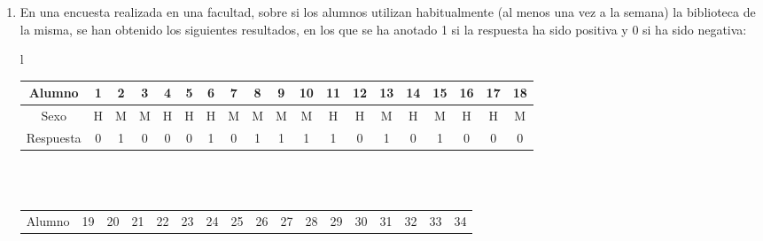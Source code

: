 \documentclass[a4paper]{article}
\begin{document}
\begin{enumerate}[leftmargin=*]
\begin{enumerate}
\end{enumerate}

\item En una encuesta realizada en una facultad, sobre si los
alumnos utilizan habitualmente (al menos una vez a la semana) la
biblioteca de la misma, se han obtenido los siguientes resultados,
en los que se ha anotado 1 si la respuesta ha sido positiva y 0 si
ha sido negativa:
\begin{center}
\begin{tabular}{l}
\begin{tabular}{|l|l|l|l|l|l|l|l|l|l|l|l|l|l|l|l|l|l|l|}
\hline
\multicolumn{1}{|c|}{Alumno} & \multicolumn{1}{c|}{1} & \multicolumn{1}{c|}{2} & \multicolumn{1}{c|}{3} & \multicolumn{1}{c|}{4} & \multicolumn{1}{c|}{5} & \multicolumn{1}{c|}{6} & \multicolumn{1}{c|}{7} & \multicolumn{1}{c|}{8} & \multicolumn{1}{c|}{9} & \multicolumn{1}{c|}{10} & \multicolumn{1}{c|}{11} & \multicolumn{1}{c|}{12} & \multicolumn{1}{c|}{13} & \multicolumn{1}{c|}{14} & \multicolumn{1}{c|}{15} & \multicolumn{1}{c|}{16} & \multicolumn{1}{c|}{17} & \multicolumn{1}{c|}{18} \\
\hline
\multicolumn{1}{|c|}{Sexo} & \multicolumn{1}{c|}{H} & \multicolumn{1}{c|}{M} & \multicolumn{1}{c|}{M} & \multicolumn{1}{c|}{H} & \multicolumn{1}{c|}{H} & \multicolumn{1}{c|}{H} & \multicolumn{1}{c|}{M} & \multicolumn{1}{c|}{M} & \multicolumn{1}{c|}{M} & \multicolumn{1}{c|}{M} & \multicolumn{1}{c|}{H} & \multicolumn{1}{c|}{H} & \multicolumn{1}{c|}{M} & \multicolumn{1}{c|}{H} & \multicolumn{1}{c|}{M} & \multicolumn{1}{c|}{H} & \multicolumn{1}{c|}{H} & \multicolumn{1}{c|}{M} \\
\hline
\multicolumn{1}{|c|}{Respuesta} & \multicolumn{1}{c|}{0} & \multicolumn{1}{c|}{1} & \multicolumn{1}{c|}{0} & \multicolumn{1}{c|}{0} & \multicolumn{1}{c|}{0} & \multicolumn{1}{c|}{1} & \multicolumn{1}{c|}{0} & \multicolumn{1}{c|}{1} & \multicolumn{1}{c|}{1} & \multicolumn{1}{c|}{1} & \multicolumn{1}{c|}{1} & \multicolumn{1}{c|}{0} & \multicolumn{1}{c|}{1} & \multicolumn{1}{c|}{0} & \multicolumn{1}{c|}{1} & \multicolumn{1}{c|}{0} & \multicolumn{1}{c|}{0} & \multicolumn{1}{c|}{0} \\
\hline
\end{tabular}\\
\\
\begin{tabular}{|l|l|l|l|l|l|l|l|l|l|l|l|l|l|l|l|l|}
\hline
\multicolumn{1}{|c|}{Alumno} & \multicolumn{1}{c|}{19} & \multicolumn{1}{c|}{20} & \multicolumn{1}{c|}{21} & \multicolumn{1}{c|}{22} & \multicolumn{1}{c|}{23} & \multicolumn{1}{c|}{24} & \multicolumn{1}{c|}{25} & \multicolumn{1}{c|}{26} & \multicolumn{1}{c|}{27} & \multicolumn{1}{c|}{28} & \multicolumn{1}{c|}{29} & \multicolumn{1}{c|}{30} & \multicolumn{1}{c|}{31} & \multicolumn{1}{c|}{32} & \multicolumn{1}{c|}{33} & \multicolumn{1}{c|}{34} \\

\end{tabular}
\end{tabular}
\end{center}
\end{enumerate}
\end{document}

